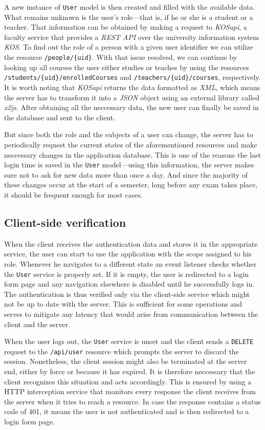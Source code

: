 \documentclass[thesis=M,english,hidelinks]{FITthesis}[2012/10/20]
\newcommand{\code}{\texttt}
\begin{document}
A new instance of \code{User} model is then created and filled with the available data. What remains unknown is the user's role---that is, if he or she is a student or a teacher. That information can be obtained by making a request to \textit{KOSapi}, a faculty service that provides a \textit{REST API} over the university information system \textit{KOS}. To find out the role of a person with a given user identifier we can utilize the resource \code{/people/\{uid\}}. With that issue resolved, we can continue by looking up all courses the user either studies or teaches by using the resources \code{/students/\{uid\}/enrolledCourses} and \code{/teachers/\{uid\}/courses}, respectively. It is worth noting that \textit{KOSapi} returns the data formatted as \textit{XML}, which means the server has to transform it into a \textit{JSON} object using an external library called \textit{x2js}. After obtaining all the neccessary data, the new user can finally be saved in the database and sent to the client.

But since both the role and the subjects of a user can change, the server has to periodically request the current states of the aforementioned resources and make neccessary changes in the application database. This is one of the reasons the last login time is saved in the \code{User} model---using this information, the server makes sure not to ask for new data more than once a day. And since the majority of these changes occur at the start of a semester, long before any exam takes place, it should be frequent enough for most cases.

\subsection{Client-side verification}

When the client receives the authentication data and stores it in the appropriate service, the user can start to use the application with the scope assigned to his role. Whenever he navigates to a different state an event listener checks whether the \code{User} service is properly set. If it is empty, the user is redirected to a login form page and any navigation elsewhere is disabled until he successfully logs in. The authentication is thus verified only via the client-side service which might not be up to date with the server. This is sufficient for some operations and serves to mitigate any latency that would arise from communication between the client and the server.

When the user logs out, the \code{User} service is unset and the client sends a \code{DELETE} request to the \code{/api/user} resource which prompts the server to discard the session. Nonetheless, the client session might also be terminated at the server end, either by force or because it has expired. It is therefore neccessary that the client recognizes this situation and acts accordingly. This is ensured by using a HTTP interception service that monitors every response the client receives from the server when it tries to reach a resource. In case the response contains a status code of 401, it means the user is not authenticated and is then redirected to a login form page.
\end{document}
